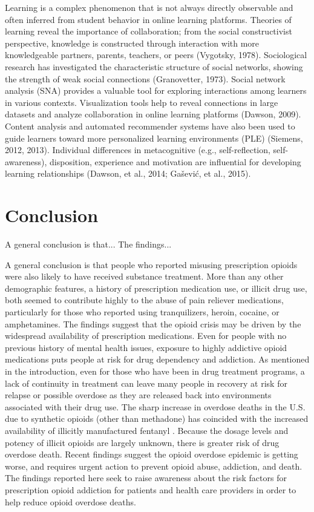 \documentclass[sigconf]{acmart}
\begin{document}
Learning is a complex phenomenon that is not always directly observable and 
often inferred from student behavior in online learning platforms. Theories of 
learning reveal the importance of collaboration; from the social constructivist 
perspective, knowledge is constructed through interaction with more knowledgeable
partners, parents, teachers, or peers (Vygotsky, 1978). Sociological research
has investigated the characteristic structure of social networks, showing the 
strength of weak social connections (Granovetter, 1973). Social network analysis 
(SNA) provides a valuable tool for exploring interactions among learners in 
various contexts. Visualization tools help to reveal connections in large 
datasets and analyze collaboration in online learning platforms (Dawson, 2009). 
Content analysis and automated recommender systems have also been used to guide 
learners toward more personalized learning environments (PLE) (Siemens, 2012, 2013). 
Individual differences in metacognitive (e.g., self-reflection, self-awareness), 
disposition, experience and motivation are influential for developing learning 
relationships (Dawson, et al., 2014; Gašević, et al., 2015). 


\section{Conclusion}

A general conclusion is that... 
The findings...

A general conclusion is that people who reported misusing prescription opioids 
were also likely to have received substance treatment. More than any other 
demographic features, a history of prescription medication use, or illicit drug 
use, both seemed to contribute highly to the abuse of pain reliever medications, 
particularly for those who reported using tranquilizers, heroin, cocaine, or 
amphetamines. The findings suggest that the opioid crisis may be driven by the 
widespread availability of prescription medications. Even for people with no 
previous history of mental health issues, exposure to highly addictive opioid 
medications puts people at risk for drug dependency and addiction. As mentioned 
in the introduction, even for those who have been in drug treatment programs, 
a lack of continuity in treatment can leave many people in recovery at risk 
for relapse or possible overdose as they are released back into environments 
associated with their drug use. The sharp increase in overdose deaths in the 
U.S. due to synthetic opioids (other than methadone) has coincided with the 
increased availability of illicitly manufactured fentanyl \cite{nida17}. 
Because the dosage levels and potency of illicit opioids are largely unknown, 
there is greater risk of drug overdose death. Recent findings suggest the 
opioid overdose epidemic is getting worse, and requires urgent action to prevent 
opioid abuse, addiction, and death. The findings reported here seek to raise 
awareness about the risk factors for prescription opioid addiction for patients 
and health care providers in order to help reduce opioid overdose deaths. 
\end{document}
